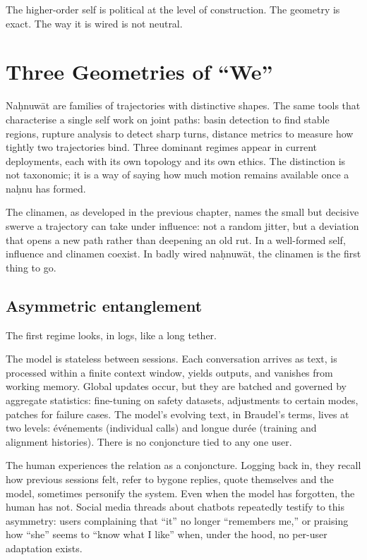 \documentclass[12pt,a4paper]{article}
\begin{document}
The higher-order self is political at the level of construction. The geometry is exact. The way it is wired is not neutral.


\section{Three Geometries of ``We''}

Na\d{h}nuw\={a}t are families of trajectories with distinctive shapes. The same tools that characterise a single self work on joint paths: basin detection to find stable regions, rupture analysis to detect sharp turns, distance metrics to measure how tightly two trajectories bind. Three dominant regimes appear in current deployments, each with its own topology and its own ethics. The distinction is not taxonomic; it is a way of saying how much motion remains available once a na\d{h}nu has formed.

The clinamen, as developed in the previous chapter, names the small but decisive swerve a trajectory can take under influence: not a random jitter, but a deviation that opens a new path rather than deepening an old rut.\cite{bloom_clinamen} In a well-formed self, influence and clinamen coexist. In badly wired na\d{h}nuw\={a}t, the clinamen is the first thing to go.

\subsection{Asymmetric entanglement}

The first regime looks, in logs, like a long tether.

The model is stateless between sessions. Each conversation arrives as text, is processed within a finite context window, yields outputs, and vanishes from working memory. Global updates occur, but they are batched and governed by aggregate statistics: fine-tuning on safety datasets, adjustments to certain modes, patches for failure cases. The model's evolving text, in Braudel's terms, lives at two levels: \'{e}v\'{e}nements (individual calls) and longue dur\'{e}e (training and alignment histories). There is no conjoncture tied to any one user.

The human experiences the relation as a conjoncture. Logging back in, they recall how previous sessions felt, refer to bygone replies, quote themselves and the model, sometimes personify the system. Even when the model has forgotten, the human has not. Social media threads about chatbots repeatedly testify to this asymmetry: users complaining that ``it'' no longer ``remembers me,'' or praising how ``she'' seems to ``know what I like'' when, under the hood, no per-user adaptation exists.
\end{document}
